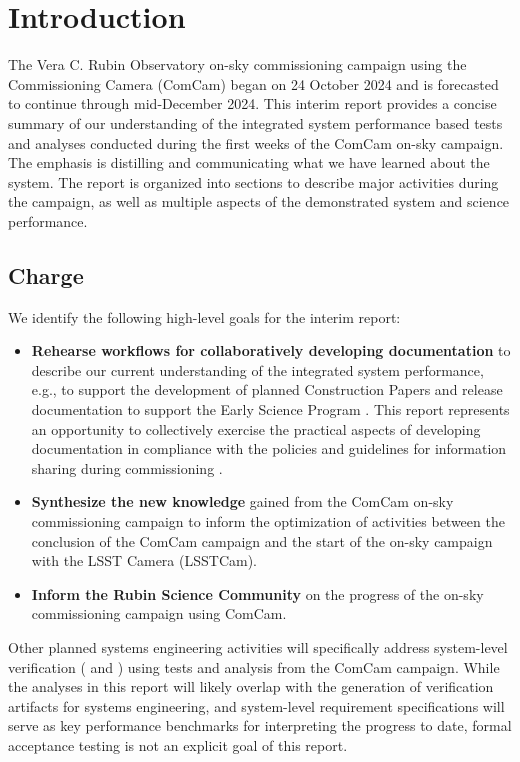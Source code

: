 \section{Introduction}
\label{sec:introduction}

The Vera C. Rubin Observatory on-sky commissioning campaign using the Commissioning Camera (ComCam) began on 24 October 2024 and is forecasted to continue through mid-December 2024.
This interim report provides a concise summary of our understanding of the integrated system performance based tests and analyses conducted during the first weeks of the ComCam on-sky campaign.
The emphasis is distilling and communicating what we have learned about the system.
The report is organized into sections to describe major activities during the campaign, as well as multiple aspects of the demonstrated system and science performance.

\subsection{Charge}

We identify the following high-level goals for the interim report:

\begin{itemize}

    \item \textbf{Rehearse workflows for collaboratively developing documentation} to describe our current understanding of the integrated system performance, e.g., to support the development of planned Construction Papers and release documentation to support the Early Science Program .
    This report represents an opportunity to collectively exercise the practical aspects of developing documentation in compliance with the policies and guidelines for information sharing during commissioning .

    \item \textbf{Synthesize the new knowledge} gained from the ComCam on-sky commissioning campaign to inform the optimization of activities between the conclusion of the ComCam campaign and the start of the on-sky campaign with the LSST Camera (LSSTCam).

    \item \textbf{Inform the Rubin Science Community} on the progress of the on-sky commissioning campaign using ComCam.

\end{itemize}

Other planned systems engineering activities will specifically address system-level verification ( and ) using tests and analysis from the ComCam campaign.
While the analyses in this report will likely overlap with the generation of verification artifacts for systems engineering, and system-level requirement specifications will serve as key performance benchmarks for interpreting the progress to date, formal acceptance testing is not an explicit goal of this report.

